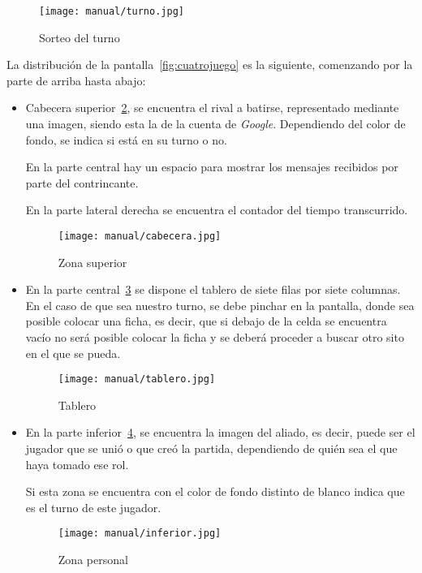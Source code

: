 \begin{figure}[H]
	\centering
	\texttt{[image: manual/turno.jpg]}
	\caption{Sorteo del turno}\label{fig:sorteo}
\end{figure}

La distribución de la pantalla~\ref{fig:cuatrojuego} es la siguiente, comenzando por la parte de arriba hasta abajo:

\begin{itemize}
	\item Cabecera superior~\ref{fig:cabecera}, se encuentra el rival a batirse, representado mediante una imagen, siendo esta la de la cuenta de \emph{Google}. Dependiendo del color de fondo, se indica si está en su turno o no.
	
	En la parte central hay un espacio para mostrar los mensajes recibidos por parte del contrincante.
	
	En la parte lateral derecha se encuentra el contador del tiempo transcurrido.
	
	 \begin{figure}[H]
	 	\centering
	 	\texttt{[image: manual/cabecera.jpg]}
	 	\caption{Zona superior}\label{fig:cabecera}
	 \end{figure}
 
	\item En la parte central~\ref{fig:tablero} se dispone el tablero de siete filas por siete columnas. En el caso de que sea nuestro turno, se debe pinchar en la pantalla, donde sea posible colocar una ficha, es decir, que si debajo de la celda se encuentra vacío no será posible colocar la ficha y se deberá proceder a buscar otro sito en el que se pueda.
	
	\begin{figure}[H]
		\centering
		\texttt{[image: manual/tablero.jpg]}
		\caption{Tablero}\label{fig:tablero}
	\end{figure}

	\item En la parte inferior~\ref{fig:inferior}, se encuentra la imagen del aliado, es decir, puede ser el jugador que se unió o que creó la partida, dependiendo de quién sea el que haya tomado ese rol.
	
	Si esta zona se encuentra con el color de fondo distinto de blanco indica que es el turno de este jugador.
	
	\begin{figure}[H]
		\centering
		\texttt{[image: manual/inferior.jpg]}
		\caption{Zona personal}\label{fig:inferior}
	\end{figure}


\end{itemize}
